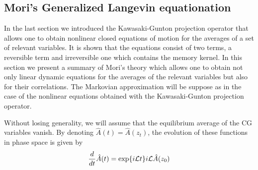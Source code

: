 \documentclass[b5paper,openright,10pt]{book}
\begin{document}
\subsection{Mori's Generalized Langevin equationation}
\label{Sec:Mori}
In the last section we introduced the Kawasaki-Gunton projection operator that allows one to obtain nonlinear closed equations of motion for the averages of a set of relevant variables. It is shown that the equations consist of two terms, a reversible term and irreversible one which contains the memory kernel. 
In this section we present a summary of Mori's theory \cite{Mori1965} which allows one to obtain not only linear dynamic equations for the averages of the relevant variables but also for their correlations. The Markovian approximation will be suppose as in the case of the nonlinear equations obtained with the Kawasaki-Gunton projection operator. 

Without  losing  generality,  we  will assume  that  the  equilibrium
average   of    the   CG    variables   vanish.    By    denoting  
$\hat{A}(t)=\hat{A}(z_t)$, the  evolution of these functions  in phase
space is given by
\begin{eqnarray}
\frac{d}{dt}{\hat{A}}(t)=\exp\{i{\cal L}t\}i{\cal L}\hat{A}(z_0)
\label{LA}
\end{eqnarray}

\end{document}

